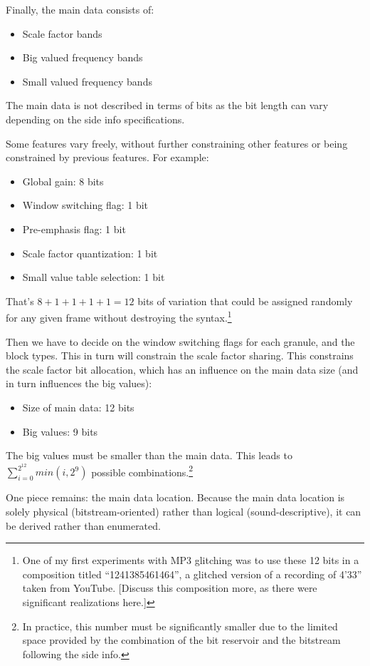 \documentclass{thesis}
\begin{document}
	Finally, the main data consists of:
	
\begin{itemize}
	\item Scale factor bands
	\item Big valued frequency bands
	\item Small valued frequency bands
\end{itemize}

	The main data is not described in terms of bits as the bit length can vary depending on the side info specifications.

	Some features vary freely, without further constraining other features or being constrained by previous features. For example:

\begin{itemize}
	\item Global gain: 8 bits
	\item Window switching flag: 1 bit
	\item Pre-emphasis flag: 1 bit
	\item Scale factor quantization: 1 bit
	\item Small value table selection: 1 bit
\end{itemize}

	That's $8+1+1+1+1=12$ bits of variation that could be assigned randomly for any given frame without destroying the syntax.\footnote{One of my first experiments with MP3 glitching was to use these 12 bits in a composition titled ``1241385461464'', a glitched version of a recording of 4'33'' taken from YouTube. [Discuss this composition more, as there were significant realizations here.]}
	
	Then we have to decide on the window switching flags for each granule, and the block types. This in turn will constrain the scale factor sharing. This constrains the scale factor bit allocation, which has an influence on the main data size (and in turn influences the big values):
	
\begin{itemize}
	\item Size of main data: 12 bits
	\item Big values: 9 bits
\end{itemize}

	The big values must be smaller than the main data. This leads to $\sum_{i=0}^{2^{12}} min(i,2^9)$ possible combinations.\footnote{In practice, this number must be significantly smaller due to the limited space provided by the combination of the bit reservoir and the bitstream following the side info.}
	
	One piece remains: the main data location. Because the main data location is solely physical (bitstream-oriented) rather than logical (sound-descriptive), it can be derived rather than enumerated.
\end{document}
